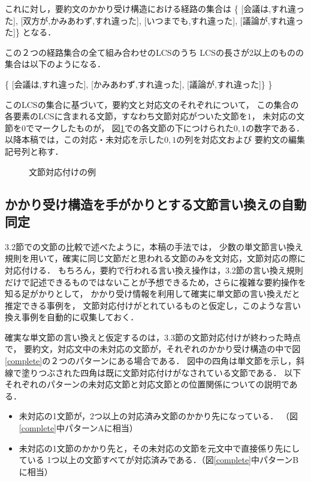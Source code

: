 これに対し，要約文のかかり受け構造における経路の集合は
\{
[会議は,すれ違った],
[双方が,かみあわず,すれ違った],
[いつまでも,すれ違った],
[議論が,すれ違った]\}
となる．

この２つの経路集合の全て組み合わせのLCSのうち
LCSの長さが2以上のものの集合は以下のようになる．

\{
[会議は,すれ違った],
[かみあわず,すれ違った],
[議論が,すれ違った]\}
\}

このLCSの集合に基づいて，要約文と対応文のそれぞれについて，
この集合の各要素のLCSに含まれる文節，すなわち文節対応がついた文節を$1$，
未対応の文節を$0$でマークしたものが，
図\ref{cmppair}での各文節の下につけられた${0,1}$の数字である．
以降本稿では，この対応・未対応を示した${0,1}$の列を対応文および
要約文の編集記号列と称す．

\begin{figure}[htbp]
\begin{center}
\caption{文節対応付けの例}
\label{cmppair}
\end{center}
\end{figure}


\subsection{かかり受け構造を手がかりとする文節言い換えの自動同定}

3.2節での文節の比較で述べたように，本稿の手法では，
少数の単文節言い換え規則を用いて，確実に同じ文節だと思われる文節のみを文対応，文節対応の際に対応付ける．
もちろん，要約で行われる言い換え操作は，3.2節の言い換え規則だけで記述できるものではないことが予想できるため，さらに複雑な要約操作を知る足がかりとして，
かかり受け情報を利用して確実に単文節の言い換えだと推定できる事例を，
文節対応付けがとれているものと仮定し，このような言い換え事例を自動的に収集しておく．

確実な単文節の言い換えと仮定するのは，3.3節の文節対応付けが終わった時点で，
要約文，対応文中の未対応の文節が，それぞれのかかり受け構造の中で図\ref{complete}の２つのパターンにある場合である．
図中の四角は単文節を示し，斜線で塗りつぶされた四角は既に文節対応付けがなされている文節である．
以下それぞれのパターンの未対応文節と対応文節との位置関係についての説明である．

\begin{itemize}
\item 未対応の1文節が，2つ以上の対応済み文節のかかり先になっている．
（図\ref{complete}中パターンAに相当）
\item 未対応の1文節のかかり先と，その未対応の文節を元文中で直接係り先にしている
1つ以上の文節すべてが対応済みである．（図\ref{complete}中パターンBに相当）

\end{itemize}

